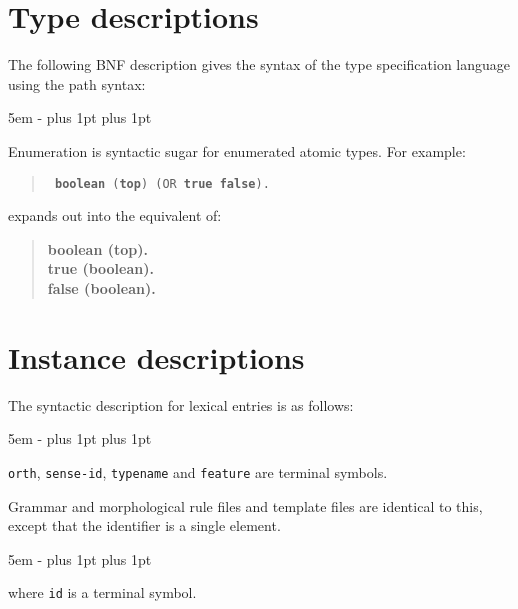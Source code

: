\documentclass[12pt]{report}
\begin{document}
\section{Type descriptions}

The following BNF description gives the syntax of the type specification 
language using the path syntax:
\begin{list}{}
   {\leftmargin 5em
    \itemindent -\leftmargin
    \itemsep 0pt plus 1pt
    \parsep 0pt plus 1pt}
\end{list}
Enumeration is syntactic sugar for enumerated atomic types.  For example:
\begin{quote}
\tt
{\bf boolean} ({\bf top}) (OR {\bf true} {\bf false}).
\end{quote}
expands out into the equivalent of:
\begin{quote}
\bf
{\bf boolean} ({\bf top}).\\
{\bf true} ({\bf boolean}).\\
{\bf false} ({\bf boolean}).
\end{quote}

\section{Instance descriptions}

The syntactic description for lexical entries is as follows:
\begin{list}{}
   {\leftmargin 5em
    \itemindent -\leftmargin
    \itemsep 0pt plus 1pt
    \parsep 0pt plus 1pt}
\end{list}
{\tt orth}, {\tt sense-id},
{\tt typename} and {\tt feature} are 
terminal symbols.

Grammar and morphological rule files 
and template files are identical to this, 
except that the identifier is a single element.
\begin{list}{}
   {\leftmargin 5em
    \itemindent -\leftmargin
    \itemsep 0pt plus 1pt
    \parsep 0pt plus 1pt}
\end{list}
where {\tt id} is a terminal symbol.
\end{document}
